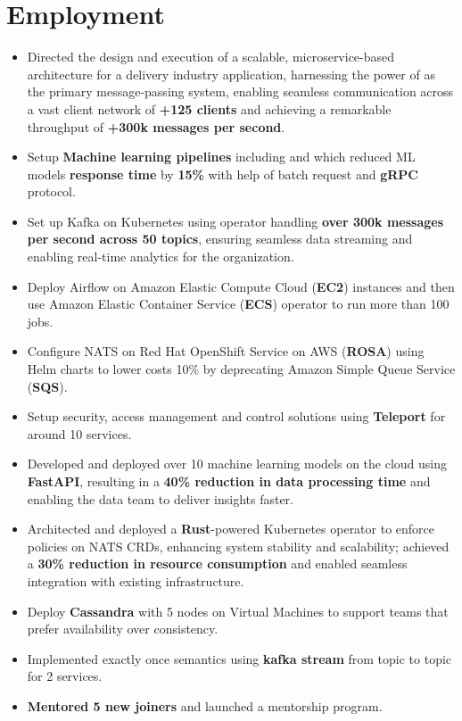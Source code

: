 \section{Employment}

\begin{itemize}
      \item Directed the design and execution of a scalable, microservice-based architecture for a delivery industry application, harnessing the power of  as the primary message-passing system, enabling seamless communication across a vast client network of \textbf{+125 clients} and achieving a remarkable throughput of \textbf{+300k messages per second}.
      \item Setup \textbf{Machine learning pipelines} including  and
             which reduced ML models \textbf{response time} by \textbf{15\%}
            with help of batch request and \textbf{gRPC} protocol.
      \item Set up Kafka on Kubernetes using  operator handling \textbf{over 300k messages per second across 50 topics}, ensuring seamless data streaming and enabling real-time analytics for the organization.
      \item Deploy Airflow on Amazon Elastic Compute Cloud (\textbf{EC2}) instances and then use
            Amazon Elastic Container Service (\textbf{ECS}) operator
            to run more than 100 jobs.
      \item Configure NATS on Red Hat OpenShift Service on AWS (\textbf{ROSA})
            using Helm charts to lower costs 10\% by deprecating Amazon Simple Queue Service (\textbf{SQS}).
      \item Setup security, access management and control solutions using \textbf{Teleport} for around 10 services.
      \item Developed and deployed over 10 machine learning models on the cloud using \textbf{FastAPI}, resulting in a \textbf{40\% reduction in data processing time} and enabling the data team to deliver insights faster.
      \item Architected and deployed a \textbf{Rust}-powered Kubernetes operator to enforce policies on NATS CRDs, enhancing system stability and scalability; achieved a \textbf{30\% reduction in resource consumption} and enabled seamless integration with existing infrastructure.
      \item Deploy \textbf{Cassandra} with 5 nodes on Virtual Machines to support teams that prefer availability over consistency.
      \item Implemented exactly once semantics using \textbf{kafka stream} from topic to topic for 2 services.
      \item \textbf{Mentored 5 new joiners} and launched a mentorship program.
\end{itemize}

